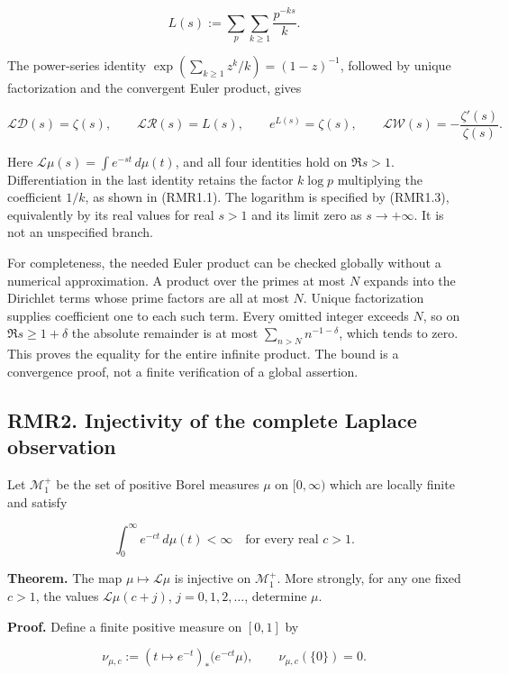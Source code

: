 \documentclass[
]{article}
\begin{document}
\[
L(s):=\sum_p\sum_{k\ge1}\frac{p^{-ks}}k.
\tag{RMR1.3}
\]

The power-series identity \(\exp(\sum_{k\ge1}z^k/k)=(1-z)^{-1}\),
followed by unique factorization and the convergent Euler product, gives

\[
\mathcal L\mathcal D(s)=\zeta(s),\qquad
\mathcal L\mathcal R(s)=L(s),\qquad
e^{L(s)}=\zeta(s),\qquad
\mathcal L\mathcal W(s)=-\frac{\zeta'(s)}{\zeta(s)}.
\tag{RMR1.4}
\]

Here \(\mathcal L\mu(s)=\int e^{-st}\,d\mu(t)\), and all four identities
hold on \(\Re s>1\). Differentiation in the last identity retains the
factor \(k\log p\) multiplying the coefficient \(1/k\), as shown in
(RMR1.1). The logarithm is specified by (RMR1.3), equivalently by its
real values for real \(s>1\) and its limit zero as \(s\to+\infty\). It
is not an unspecified branch.

For completeness, the needed Euler product can be checked globally
without a numerical approximation. A product over the primes at most
\(N\) expands into the Dirichlet terms whose prime factors are all at
most \(N\). Unique factorization supplies coefficient one to each such
term. Every omitted integer exceeds \(N\), so on \(\Re s\ge1+\delta\)
the absolute remainder is at most \(\sum_{n>N}n^{-1-\delta}\), which
tends to zero. This proves the equality for the entire infinite product.
The bound is a convergence proof, not a finite verification of a global
assertion.

\subsection{RMR2. Injectivity of the complete Laplace
observation}\label{rmr2.-injectivity-of-the-complete-laplace-observation}

Let \(\mathscr M_1^+\) be the set of positive Borel measures \(\mu\) on
\([0,\infty)\) which are locally finite and satisfy

\[
\int_0^\infty e^{-ct}\,d\mu(t)<\infty
\quad\text{for every real }c>1.
\tag{RMR2.1}
\]

\textbf{Theorem.} The map \(\mu\mapsto\mathcal L\mu\) is injective on
\(\mathscr M_1^+\). More strongly, for any one fixed \(c>1\), the values
\(\mathcal L\mu(c+j)\), \(j=0,1,2,\ldots\), determine \(\mu\).

\textbf{Proof.} Define a finite positive measure on \([0,1]\) by

\[
\nu_{\mu,c}:=(t\mapsto e^{-t})_*\bigl(e^{-ct}\mu\bigr),
\qquad \nu_{\mu,c}(\{0\})=0.
\tag{RMR2.2}
\]
\end{document}
